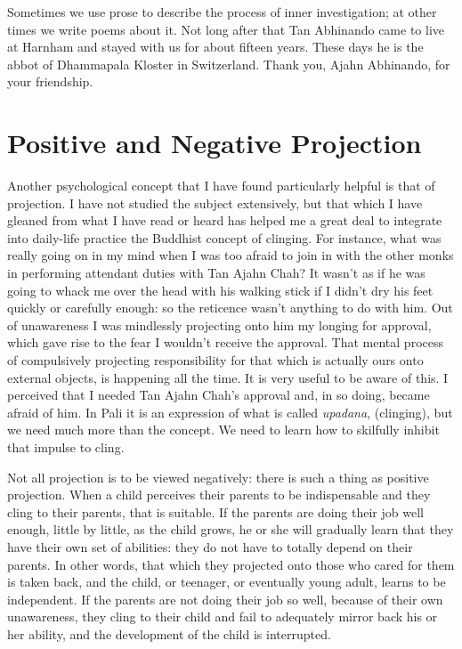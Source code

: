 Sometimes we use prose to describe the process of inner investigation;
at other times we write poems about it. Not long after that Tan
Abhinando came to live at Harnham and stayed with us for about fifteen
years. These days he is the abbot of Dhammapala Kloster in Switzerland.
Thank you, Ajahn Abhinando, for your friendship.

\section{Positive and Negative Projection}

Another psychological concept that I have found particularly helpful is
that of projection. I have not studied the subject extensively, but that
which I have gleaned from what I have read or heard has helped me a
great deal to integrate
into daily-life practice the Buddhist concept of clinging.
For instance, what was really going on in my mind when I was
too afraid to join in with the other monks in performing attendant
duties with Tan Ajahn Chah? It wasn't as if he was going to whack me
over the head with his walking stick if I didn't dry his feet quickly or
carefully enough: so the reticence wasn't anything to do with him. Out
of unawareness I was mindlessly projecting onto him my longing for
approval, which gave rise to the fear I wouldn't receive the approval.
That mental process of compulsively projecting responsibility for that
which is actually ours onto external objects, is happening all the time.
It is very useful to be aware of this. I perceived that I needed Tan Ajahn
Chah's approval and, in so doing, became afraid of him. In Pali it is an
expression of what is called \emph{upadana}, (clinging), but we need
much more than the concept. We need to learn how to skilfully inhibit
that impulse to cling.

Not all projection is to be viewed negatively: there is such a thing as
positive projection. When a child perceives their parents to be
indispensable and they cling to their parents, that is suitable. If the
parents are doing their job well enough, little by little, as the child
grows, he or she will gradually learn that they have their own set of
abilities: they do not have to totally depend on their parents. In other
words, that which they projected onto those who cared for them is taken
back, and the child, or teenager, or eventually young adult, learns to
be independent. If the parents are not doing their job so well, because
of their own unawareness, they cling to their child and fail to
adequately mirror back his or her ability, and the development of the
child is interrupted.


